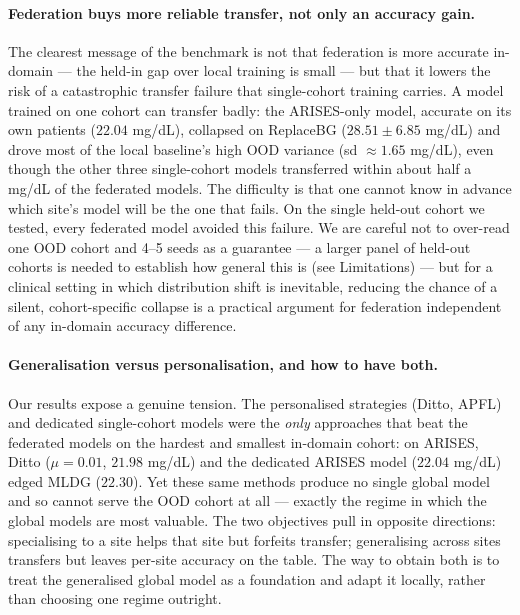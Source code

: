 \documentclass[10pt,letterpaper]{article}
\begin{document}
\paragraph{Federation buys more reliable transfer, not only an accuracy gain.}
The clearest message of the benchmark is not that federation is more accurate
in-domain --- the held-in gap over local training is small --- but that it
lowers the risk of a catastrophic transfer failure that single-cohort training
carries. A model trained on one cohort can transfer badly: the ARISES-only
model, accurate on its own patients ($22.04$ mg/dL), collapsed on ReplaceBG
($28.51 \pm 6.85$ mg/dL) and drove most of the local baseline's high OOD variance
(sd $\approx 1.65$ mg/dL), even though the other three single-cohort models
transferred within about half a mg/dL of the federated models. The difficulty is
that one cannot know in advance which site's model will be the one that fails. On
the single held-out cohort we tested, every federated model avoided this failure.
We are careful not to over-read one OOD cohort and 4--5 seeds as a guarantee ---
a larger panel of held-out cohorts is needed to establish how general this is
(see Limitations) --- but for a clinical setting in which distribution shift is
inevitable, reducing the chance of a silent, cohort-specific collapse is a
practical argument for federation independent of any in-domain accuracy
difference.

\paragraph{Generalisation versus personalisation, and how to have both.} Our
results expose a genuine tension. The personalised strategies (Ditto, APFL) and
dedicated single-cohort models were the \emph{only} approaches that beat the
federated models on the hardest and smallest in-domain cohort: on ARISES, Ditto
($\mu{=}0.01$, $21.98$ mg/dL) and the dedicated ARISES model ($22.04$ mg/dL) edged
MLDG ($22.30$). Yet these same methods produce no single global model and so
cannot serve the OOD cohort at all --- exactly the regime in which the global
models are most valuable. The two objectives pull in opposite directions:
specialising to a site helps that site but forfeits transfer; generalising across
sites transfers but leaves per-site accuracy on the table. The way to obtain both
is to treat the generalised global model as a foundation and adapt it locally,
rather than choosing one regime outright.
\end{document}

